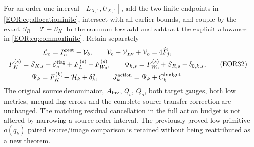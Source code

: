 \documentclass[11pt,a4paper]{article}
\begin{document}
For an order-one interval $[L_{X,1},U_{X,1}]$, add the two finite endpoints in
\eqref{EOR:eq:allocationfinite}, intersect with all earlier bounds, and couple by
the exact $S_R=\mathcal T-S_K$. In the common loss add and subtract the explicit
allowance in \eqref{EOR:eq:commonfinite}. Retain separately
\begin{equation}
\begin{gathered}
 \mathcal L_e=P_e^{\rm rest}-\mathcal V_b,\qquad
 \mathcal V_b+\mathcal V_{\rm inv}+\mathcal V_o=4\widehat F_j,\\
 F_K^{(s)}=S_{K,s}-\mathcal E_s^{\rm flag}+F_L^{(s)}-F_{W_0}^{(s)},
 \qquad \Phi_{k,s}=F_{W_0}^{(s)}+S_{R,s}+\delta_{0,k,s},\\
 \Psi_k=F_K^{(k)}+\mathcal H_k+\delta_k^\sigma,
 \qquad J_k^{\rm action}=\Psi_k+C_k^{\rm budget}.
\end{gathered}\label{EOR:eq:receivers}
\tag{EOR32}
\end{equation}
The original source denominator, $A_{\rm inv}$, $Q_b$, $Q_o$, both target gauges,
both low metrics, unequal flag errors and the complete source-transfer correction
are unchanged. The matching residual cancellation in the full action budget
is not altered by narrowing a source-order interval. The previously proved
low primitive $o(q_k)$ paired source/image comparison is retained without
being reattributed as a new theorem.
\end{document}
